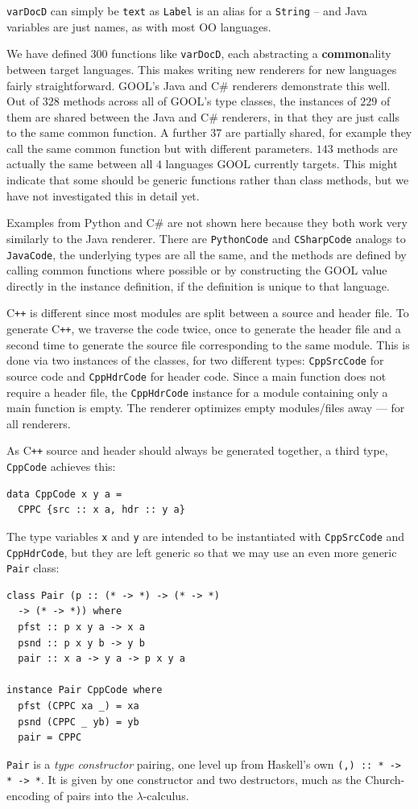 \documentclass[sigplan,review,anonymous,prologue,dvipsnames]{acmart}
\newcommand{\Csharp}{C\#}
\newcommand{\Cplusplus}{C\texttt{++}}
\newcommand{\abbrev}[1]{\textbf{#1}}
\newcommand{\common}{\abbrev{common}}
\begin{document}
\verb|varDocD| can simply be \verb|text| as \verb|Label| is an
alias for a \verb|String| -- and Java variables are just names,
as with most OO languages.

We have defined $300$ functions like \verb|varDocD|, each abstracting a 
\common ality between target languages. This
makes writing new renderers for new languages fairly straightforward.
GOOL's Java and \Csharp{} renderers demonstrate this well. Out of $328$
methods across all of GOOL's type classes, the instances of $229$ of them are
shared between the Java and \Csharp{} renderers, in that they are just calls to 
the same common function. A further $37$ are partially shared, for example they 
call the same common function but with different parameters. $143$ methods are
actually the same between all $4$ languages GOOL currently targets. This might
indicate that some should be generic functions rather than class methods,
but we have not investigated this in detail yet.

Examples from Python and \Csharp{} are not shown here because they both
work very similarly to the Java renderer. There are \verb|PythonCode| and
\verb|CSharpCode| analogs to \verb|JavaCode|, the underlying types are all the
same, and the methods are defined by calling common functions where possible
or by constructing the GOOL value directly in the instance definition, if the
definition is unique to that language.

\Cplusplus{} is different since most modules are split between a source and
header file. To generate \Cplusplus, we traverse the code twice,
once to generate the header file and a second time to generate the
source file corresponding to the same module. This is done via two instances
of the classes, for two different types: \verb|CppSrcCode| for source code and
\verb|CppHdrCode| for header code. Since a main function does not require a
header file, the \verb|CppHdrCode| instance for a module containing only a main
function is empty. The renderer optimizes empty modules/files away --- for
all renderers.

As \Cplusplus{} source and header should always be generated together, a third
type, \verb|CppCode| achieves this:
\begin{lstlisting}
data CppCode x y a =
  CPPC {src :: x a, hdr :: y a}
\end{lstlisting}
The type variables \verb|x| and \verb|y| are intended to be instantiated with
\verb|CppSrcCode| and \verb|CppHdrCode|, but they are left generic
so that we may use an even more generic \verb|Pair| class:
\begin{lstlisting}
class Pair (p :: (* -> *) -> (* -> *)
  -> (* -> *)) where
  pfst :: p x y a -> x a
  psnd :: p x y b -> y b
  pair :: x a -> y a -> p x y a

instance Pair CppCode where
  pfst (CPPC xa _) = xa
  psnd (CPPC _ yb) = yb
  pair = CPPC
\end{lstlisting}
\verb|Pair| is a \emph{type constructor} pairing, one level up from
Haskell's own \verb|(,) :: * -> * -> *|.  It is given by one constructor
and two destructors, much as the Church-encoding of pairs into the
$\lambda$-calculus.
\end{document}
